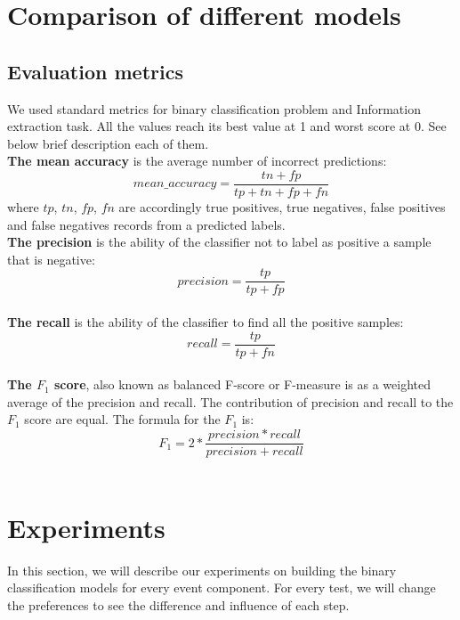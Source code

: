\section{Comparison of different models}

\subsection{Evaluation metrics}

We used standard metrics for binary classification problem and Information extraction task. All the values reach its best value at 1 and worst score at 0. See below brief description each of them.\\

\noindent\textbf{The mean accuracy} is the average number of incorrect predictions: 
$$ mean\_accuracy = \frac{tn + fp}{tp + tn + fp + fn}$$
where $tp$, $tn$, $fp$, $fn$ are accordingly true positives, true negatives, false positives and false negatives records from a predicted labels.\\

\noindent\textbf{The precision} is the ability of the classifier not to label as positive a sample that is negative:
$$precision = \frac{tp}{tp + fp}$$ \\

\noindent\textbf{The recall} is the ability of the classifier to find all the positive samples:
$$recall = \frac{tp}{tp + fn}$$ \\

\noindent\textbf{The $F_1$ score}, also known as balanced F-score or F-measure is as a weighted average of the precision and recall. The contribution of precision and recall to the $F_1$ score are equal. The formula for the $F_1$ is:
$$F_1 = 2 * \frac{precision * recall}{precision + recall}$$\\


\section{Experiments}

In this section, we will describe our experiments on building the binary classification models for every event component. For every test, we will change the preferences to see the difference and influence of each step.\\

